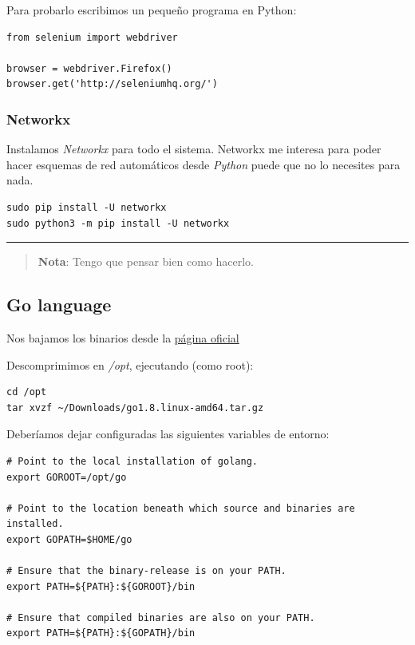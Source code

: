\documentclass[12pt,spanish,]{scrartcl}
\begin{document}
Para probarlo escribimos un pequeño programa en Python:

\begin{verbatim}
from selenium import webdriver

browser = webdriver.Firefox()
browser.get('http://seleniumhq.org/')
\end{verbatim}

\hypertarget{networkx}{%
\subsubsection{Networkx}\label{networkx}}

Instalamos \emph{Networkx} para todo el sistema. Networkx me interesa
para poder hacer esquemas de red automáticos desde \emph{Python} puede
que no lo necesites para nada.

\begin{verbatim}
sudo pip install -U networkx
sudo python3 -m pip install -U networkx
\end{verbatim}

\begin{center}\rule{0.5\linewidth}{\linethickness}\end{center}

\begin{quote}
\textbf{Nota}: Tengo que pensar bien como hacerlo.
\end{quote}

\hypertarget{go-language}{%
\subsection{Go language}\label{go-language}}

Nos bajamos los binarios desde la \href{https://golang.org/dl/}{página
oficial}

Descomprimimos en \emph{/opt}, ejecutando (como root):

\begin{verbatim}
cd /opt
tar xvzf ~/Downloads/go1.8.linux-amd64.tar.gz 
\end{verbatim}

Deberíamos dejar configuradas las siguientes variables de entorno:

\begin{verbatim}
# Point to the local installation of golang.
export GOROOT=/opt/go

# Point to the location beneath which source and binaries are installed.
export GOPATH=$HOME/go

# Ensure that the binary-release is on your PATH.
export PATH=${PATH}:${GOROOT}/bin

# Ensure that compiled binaries are also on your PATH.
export PATH=${PATH}:${GOPATH}/bin
\end{verbatim}
\end{document}

